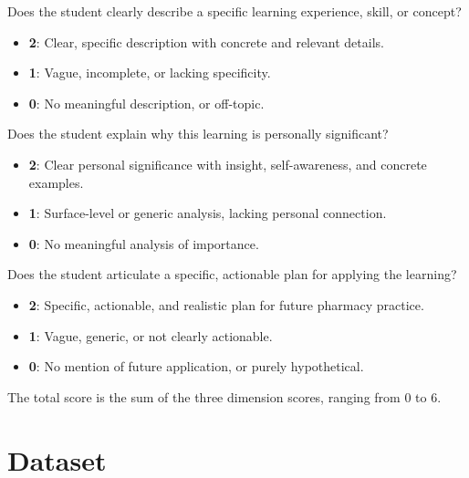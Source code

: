 \documentclass[11pt]{article}
\begin{document}
\begin{description}[leftmargin=2em, labelindent=0em]
    \item[\textbf{WHAT (Description).}] Does the student clearly describe a specific learning experience, skill, or concept?
    \begin{itemize}
        \item \textbf{2}: Clear, specific description with concrete and relevant details.
        \item \textbf{1}: Vague, incomplete, or lacking specificity.
        \item \textbf{0}: No meaningful description, or off-topic.
    \end{itemize}

    \item[\textbf{WHY (Analysis).}] Does the student explain why this learning is personally significant?
    \begin{itemize}
        \item \textbf{2}: Clear personal significance with insight, self-awareness, and concrete examples.
        \item \textbf{1}: Surface-level or generic analysis, lacking personal connection.
        \item \textbf{0}: No meaningful analysis of importance.
    \end{itemize}

    \item[\textbf{HOW (Integration).}] Does the student articulate a specific, actionable plan for applying the learning?
    \begin{itemize}
        \item \textbf{2}: Specific, actionable, and realistic plan for future pharmacy practice.
        \item \textbf{1}: Vague, generic, or not clearly actionable.
        \item \textbf{0}: No mention of future application, or purely hypothetical.
    \end{itemize}
\end{description}

The total score is the sum of the three dimension scores, ranging from 0 to 6.

\section{Dataset}
\end{document}
